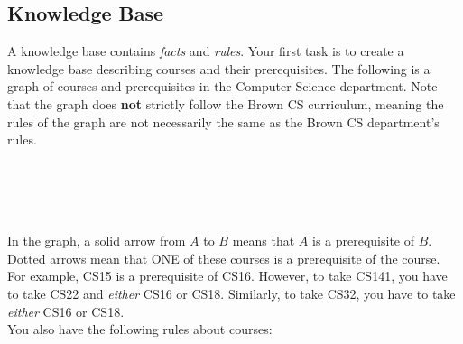 \documentclass{article}
\begin{document}

\subsection{Knowledge Base}
A knowledge base contains \textit{facts} and \textit{rules}. Your first task is to create a knowledge base describing courses and their prerequisites. The following is a graph of courses and prerequisites in the Computer Science department. Note that the graph does \textbf{not} strictly follow the Brown CS curriculum, meaning the rules of the graph are not necessarily the same as the Brown CS department's rules.\\\\
\\\\\\
In the graph, a solid arrow from $A$ to $B$ means that $A$ is a prerequisite of $B$. Dotted arrows mean that ONE of these courses is a prerequisite of the course. For example, CS15 is a prerequisite of CS16. However, to take CS141, you have to take CS22 and \textit{either} CS16 or CS18. Similarly, to take CS32, you have to take \textit{either} CS16 or CS18.\\

You also have the following rules about courses:
\end{document}
